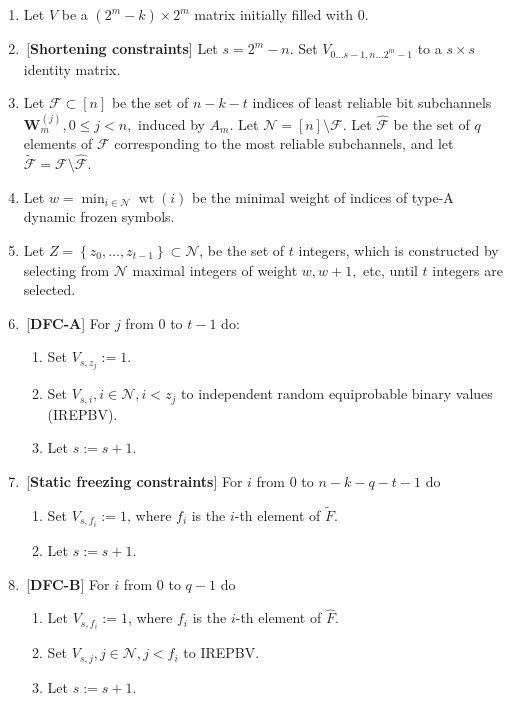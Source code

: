 \documentclass[conference]{IEEEtran}
\DeclareMathOperator{\wt}{wt}
\theoremstyle{plain}
\newcommand{\mF}{\mathcal F}
\newcommand{\set}[1]{\left\{{#1}\right\}}
\begin{document}
\begin{enumerate}
\item        Let $V$ be a $(2^m-k)\times 2^m$ matrix initially filled with 0. 
\item        \,[{\bf Shortening constraints}] Let $s=2^m-n$. Set $V_{0\dots s-1,n\dots 2^m-1}$ to a $s\times s$ identity matrix.
\item        Let  $\mF\subset [n]$ be the set of  $n-k-t$ indices of least reliable bit subchannels  $\mathbf W_m^{(j)}, 0\leq j<n,$ induced by $A_m$. Let $\mathcal N=\left[n\right]\setminus \mF$. Let  $\hat{\mathcal F}$ be the set of $q$ elements of $\mF$ corresponding to the most reliable subchannels, and let $\tilde {\mathcal F}=\mF\setminus \hat{\mathcal F}$. 
\item        Let $w=\min_{i\in\mathcal N}\wt(i)$ be the minimal weight of indices of type-A dynamic frozen symbols.
\item        Let $Z=\set{z_0,\dots,z_{t-1} }\subset \mathcal N$, be the set of $t$ integers, which is constructed by selecting from $\mathcal N$ maximal integers  of weight $w, w+1,$ etc, until $t$ integers are selected. 
\item        \,[{\bf DFC-A}] For $j$ from  $0$ to $t-1$ do:
\begin{enumerate}
\item                 Set $V_{s,z_j }:=1$. 
\item Set $V_{s,i},i\in \mathcal N,i<z_j$ to independent random equiprobable binary values (IREPBV). 
\item Let $s:=s+1$.
        \end{enumerate}
\item      \,[{\bf Static freezing constraints}]   For $i$ from  $0$ to $n-k-q-t-1$ do
\begin{enumerate}
\item        Set $V_{s,f_i }:=1$,  where $f_i$ is the $i$-th element of $\tilde F$. 
\item Let $s:=s+1$. 
        \end{enumerate}
\item        \,[{\bf DFC-B}] For $i$ from  $0$ to $q-1$ do
\begin{enumerate}
\item                Let $V_{s,f_i }:=1$,  where $f_i$ is the $i$-th element of $\hat F $.
\item        Set $V_{s,j},j\in\mathcal N,j<f_i$ to IREPBV.
\item        Let $s:=s+1$.
        \end{enumerate}
\end{enumerate}
\end{document}
